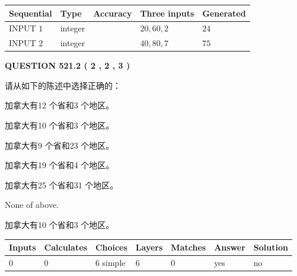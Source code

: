 \documentclass{ctexart}
\begin{document}
   
  
  
\noindent\begin{tabular}{|l|l|l|l|l|}
\hline
 Sequential & Type & Accuracy & Three inputs & Generated \\ 
\hline
 
 
  INPUT $  1 $ & integer &  & $
 20
 , 
 60
 , 
 2
 $ & $ 24 $ 
 \\  \hline  
 
 
  INPUT $  2 $ & integer &  & $
 40
 , 
 80
 , 
 7
 $ & $ 75 $ 
 \\  \hline  
 \end{tabular}
   
   
  
\vspace{0.2in}
  
{\textbf{\Large{QUESTION
521.2 
 ( 2 , 2 , 3 )
}}}
  
  
请从如下的陈述中选择正确的：
 
 
加拿大有12 个省和3 个地区。
 
 
加拿大有10 个省和3 个地区。
 
 
加拿大有9 个省和23 个地区。
 
 
加拿大有19 个省和4 个地区。
 
 
加拿大有25 个省和31 个地区。
 
 
 None of above.
 
 
\noindent{}
 
 
加拿大有10 个省和3 个地区。
 
 
\noindent{}
 
 
   
   
   
   
\noindent\begin{tabular}{|l|l|l|l|l|l|l|}
 \hline
Inputs & Calculates & Choices & Layers & Matches & Answer & Solution \\ \hline
 0  & 
 0  & 
 6
  simple  
  & 
 6  & 
 0  & 
  yes & 
  no 
  \\ \hline
 \end{tabular}
   
   
   
   
\noindent{}
   
\end{document}
